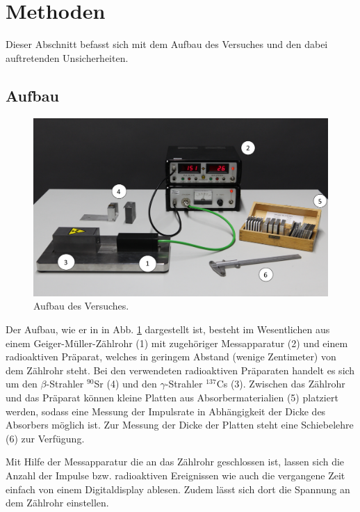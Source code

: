 \section{Methoden}
	
	Dieser Abschnitt befasst sich mit dem Aufbau des Versuches und den dabei auftretenden Unsicherheiten.
	
	\subsection{Aufbau}	
		
		\begin{figure}[ht]
			\centering
			\includegraphics[width=\textwidth]{Aufbau.png}
			\caption{Aufbau des Versuches. \cite{WWU}}
			\label{fig:Aufbau}	
		\end{figure}
		Der Aufbau, wie er in in Abb. \ref{fig:Aufbau} dargestellt ist, besteht im Wesentlichen aus einem Geiger-Müller-Zählrohr (1) mit zugehöriger Messapparatur (2) und einem radioaktiven Präparat, welches in geringem Abstand (wenige Zentimeter) von dem Zählrohr steht.
		Bei den verwendeten radioaktiven Präparaten handelt es sich um den $\beta$-Strahler $^{90}$Sr (4) und den $\gamma$-Strahler $^{137}$Cs (3).
		Zwischen das Zählrohr und das Präparat können kleine Platten aus Absorbermaterialien (5) platziert werden, sodass eine Messung der Impulsrate in Abhängigkeit der Dicke des Absorbers möglich ist.
		Zur Messung der Dicke der Platten steht eine Schiebelehre (6) zur Verfügung.
		
		Mit Hilfe der Messapparatur die an das Zählrohr geschlossen ist, lassen sich die Anzahl der Impulse bzw. radioaktiven Ereignissen wie auch die vergangene Zeit einfach von einem Digitaldisplay ablesen.
		Zudem lässt sich dort die Spannung an dem Zählrohr einstellen.
		
